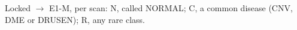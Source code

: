 Locked $\to$ E1-M, per scan: N, called NORMAL; C, a common disease (CNV, DME or DRUSEN); R, any rare class. 
